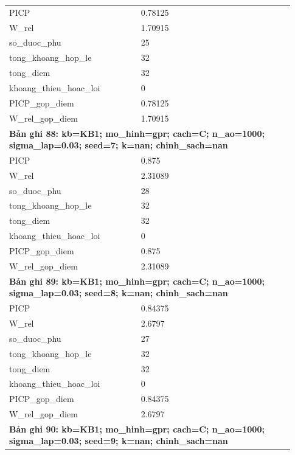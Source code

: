\begin{longtable}{p{0.43\linewidth}p{0.50\linewidth}}
PICP & 0.78125 \\
W\_\allowbreak rel & 1.70915 \\
so\_\allowbreak duoc\_\allowbreak phu & 25 \\
tong\_\allowbreak khoang\_\allowbreak hop\_\allowbreak le & 32 \\
tong\_\allowbreak diem & 32 \\
khoang\_\allowbreak thieu\_\allowbreak hoac\_\allowbreak loi & 0 \\
PICP\_\allowbreak gop\_\allowbreak diem & 0.78125 \\
W\_\allowbreak rel\_\allowbreak gop\_\allowbreak diem & 1.70915 \\
\midrule
\multicolumn{2}{p{0.95\linewidth}}{\textbf{Bản ghi 88: kb=KB1; mo\_hinh=gpr; cach=C; n\_ao=1000; sigma\_lap=0.03; seed=7; k=nan; chinh\_sach=nan}} \\
PICP & 0.875 \\
W\_\allowbreak rel & 2.31089 \\
so\_\allowbreak duoc\_\allowbreak phu & 28 \\
tong\_\allowbreak khoang\_\allowbreak hop\_\allowbreak le & 32 \\
tong\_\allowbreak diem & 32 \\
khoang\_\allowbreak thieu\_\allowbreak hoac\_\allowbreak loi & 0 \\
PICP\_\allowbreak gop\_\allowbreak diem & 0.875 \\
W\_\allowbreak rel\_\allowbreak gop\_\allowbreak diem & 2.31089 \\
\midrule
\multicolumn{2}{p{0.95\linewidth}}{\textbf{Bản ghi 89: kb=KB1; mo\_hinh=gpr; cach=C; n\_ao=1000; sigma\_lap=0.03; seed=8; k=nan; chinh\_sach=nan}} \\
PICP & 0.84375 \\
W\_\allowbreak rel & 2.6797 \\
so\_\allowbreak duoc\_\allowbreak phu & 27 \\
tong\_\allowbreak khoang\_\allowbreak hop\_\allowbreak le & 32 \\
tong\_\allowbreak diem & 32 \\
khoang\_\allowbreak thieu\_\allowbreak hoac\_\allowbreak loi & 0 \\
PICP\_\allowbreak gop\_\allowbreak diem & 0.84375 \\
W\_\allowbreak rel\_\allowbreak gop\_\allowbreak diem & 2.6797 \\
\midrule
\multicolumn{2}{p{0.95\linewidth}}{\textbf{Bản ghi 90: kb=KB1; mo\_hinh=gpr; cach=C; n\_ao=1000; sigma\_lap=0.03; seed=9; k=nan; chinh\_sach=nan}} \\

\end{longtable}
